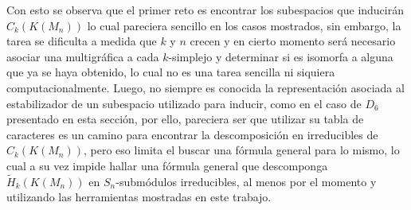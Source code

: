 \documentclass[12pt]{book}
\theoremstyle{definition}
\newcounter{in}
\begin{document}
Con esto se observa que el primer reto es encontrar los subespacios
que inducirán $C_{k}(K(M_{n}))$ lo cual pareciera sencillo en los
casos mostrados, sin embargo, la tarea se dificulta a medida que $k$ y
$n$ crecen y en cierto momento será necesario asociar una multigráfica
a cada $k$-simplejo y determinar si es isomorfa a alguna que ya se
haya obtenido, lo cual no es una tarea sencilla ni siquiera
computacionalmente. Luego, no siempre es conocida la representación
asociada al estabilizador de un subespacio utilizado para inducir, como
en el caso de $D_{6}$ presentado en esta sección, por ello, pareciera
ser que utilizar su tabla de caracteres es un camino para encontrar la
descomposición en irreducibles de $C_{k}(K(M_{n}))$, pero eso limita
el buscar una fórmula general para lo mismo, lo cual a su vez impide
hallar una fórmula general que descomponga $\widetilde
H_{k}(K(M_{n}))$ en $S_{n}$-submódulos irreducibles, al menos por el
momento y utilizando las herramientas mostradas en este trabajo.
%
\end{document}
